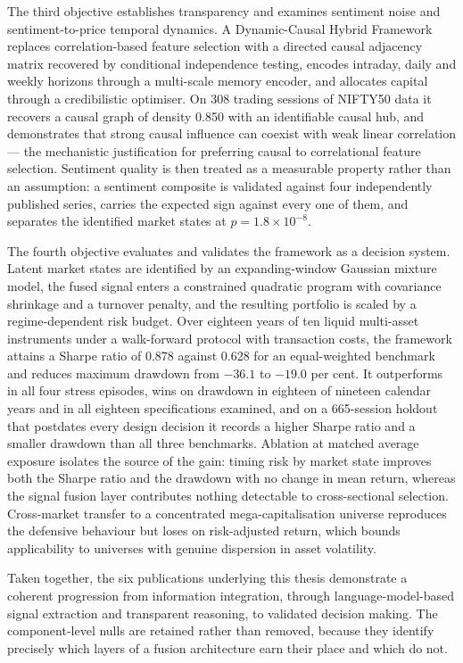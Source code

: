 The third objective establishes transparency and examines sentiment noise and
sentiment-to-price temporal dynamics. A Dynamic-Causal Hybrid Framework replaces
correlation-based feature selection with a directed causal adjacency matrix recovered by
conditional independence testing, encodes intraday, daily and weekly horizons through a
multi-scale memory encoder, and allocates capital through a credibilistic optimiser. On
308 trading sessions of NIFTY50 data it recovers a causal graph of density 0.850 with an
identifiable causal hub, and demonstrates that strong causal influence can coexist with
weak linear correlation --- the mechanistic justification for preferring causal to
correlational feature selection. Sentiment quality is then treated as a measurable property
rather than an assumption: a sentiment composite is validated against four independently
published series, carries the expected sign against every one of them, and separates the
identified market states at $p = 1.8 \times 10^{-8}$.

The fourth objective evaluates and validates the framework as a decision system. Latent
market states are identified by an expanding-window Gaussian mixture model, the fused
signal enters a constrained quadratic program with covariance shrinkage and a turnover
penalty, and the resulting portfolio is scaled by a regime-dependent risk budget. Over
eighteen years of ten liquid multi-asset instruments under a walk-forward protocol with
transaction costs, the framework attains a Sharpe ratio of 0.878 against 0.628 for an
equal-weighted benchmark and reduces maximum drawdown from $-36.1$ to $-19.0$ per cent. It
outperforms in all four stress episodes, wins on drawdown in eighteen of nineteen calendar
years and in all eighteen specifications examined, and on a 665-session holdout that
postdates every design decision it records a higher Sharpe ratio and a smaller drawdown
than all three benchmarks. Ablation at matched average exposure isolates the source of the
gain: timing risk by market state improves both the Sharpe ratio and the drawdown with no
change in mean return, whereas the signal fusion layer contributes nothing detectable to
cross-sectional selection. Cross-market transfer to a concentrated mega-capitalisation
universe reproduces the defensive behaviour but loses on risk-adjusted return, which bounds
applicability to universes with genuine dispersion in asset volatility.

Taken together, the six publications underlying this thesis demonstrate a coherent
progression from information integration, through language-model-based signal extraction
and transparent reasoning, to validated decision making. The component-level nulls are
retained rather than removed, because they identify precisely which layers of a fusion
architecture earn their place and which do not.

